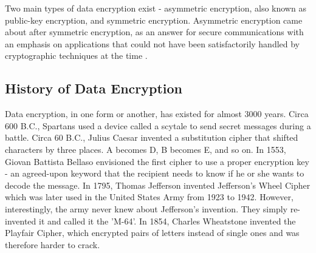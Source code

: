 \documentclass[journal]{IEEEtran}
\begin{document}
Two main types of data encryption exist - asymmetric encryption, also known as public-key encryption, and symmetric encryption. Asymmetric encryption came about after symmetric encryption, as an answer for secure communications with an emphasis on applications that could not have been satisfactorily handled by cryptographic techniques at the time \cite{asymm_symm}. %

\subsection{\textbf{History of Data Encryption}}
Data encryption, in one form or another, has existed for almost 3000 years. Circa 600 B.C., Spartans used a device called a scytale to send secret messages during a battle. Circa 60 B.C., Julius Caesar invented a substitution cipher that shifted characters by three places. A becomes D, B becomes E, and so on. In 1553, Giovan Battista Bellaso envisioned the first cipher to use a proper encryption key - an agreed-upon keyword that the recipient needs to know if he or she wants to decode the message. In 1795, Thomas Jefferson invented Jefferson's Wheel Cipher which was later used in the United States Army from 1923 to 1942. However, interestingly, the army never knew about Jefferson's invention. They simply re-invented it and called it the 'M-64'. In 1854, Charles Wheatstone invented the Playfair Cipher, which encrypted pairs of letters instead of single ones and was therefore harder to crack.
\end{document}
